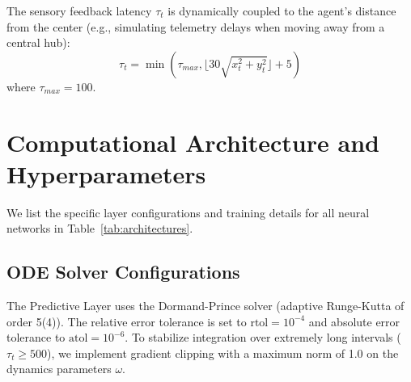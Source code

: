 \documentclass[manuscript, screen, review]{jair}
\begin{document}
The sensory feedback latency $\tau_t$ is dynamically coupled to the agent's distance from the center (e.g., simulating telemetry delays when moving away from a central hub):
\begin{equation}
    \tau_t = \min\left( \tau_{max}, \lfloor 30 \sqrt{x_t^2 + y_t^2} \rfloor + 5 \right)
\end{equation}
where $\tau_{max} = 100$.

\section{Computational Architecture and Hyperparameters}\label{app:sec_architecture}
We list the specific layer configurations and training details for all neural networks in Table~\ref{tab:architectures}.

\begin{table}[htbp]
\centering
\caption{Neural Network Architectures and Activation Functions}
\label{tab:architectures}
\vskip 0.1in
\begin{small}
\end{small}
\end{table}

\subsection{ODE Solver Configurations}\label{app:sub_ode_configs}
The Predictive Layer uses the Dormand-Prince solver (adaptive Runge-Kutta of order 5(4)). The relative error tolerance is set to $\text{rtol} = 10^{-4}$ and absolute error tolerance to $\text{atol} = 10^{-6}$. To stabilize integration over extremely long intervals ($\tau_t \ge 500$), we implement gradient clipping with a maximum norm of 1.0 on the dynamics parameters $\omega$.
\end{document}
